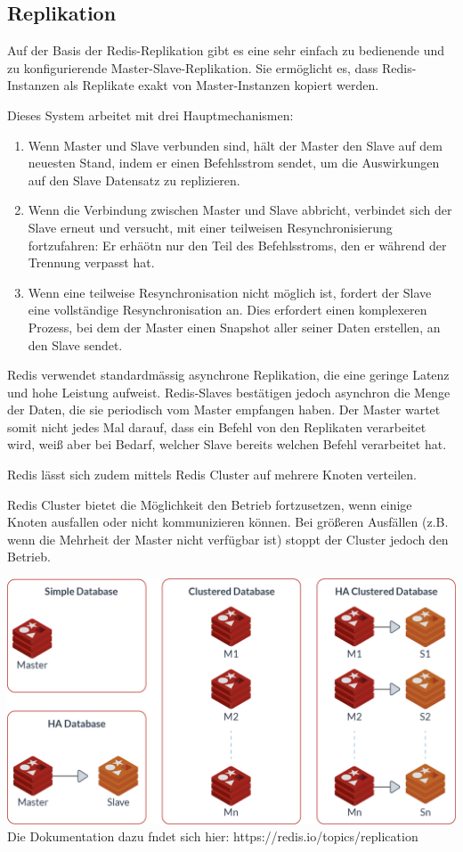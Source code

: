 \subsection{Replikation}
Auf der Basis der Redis-Replikation gibt es eine sehr einfach zu bedienende und zu konfigurierende Master-Slave-Replikation. Sie ermöglicht es, dass Redis-Instanzen als Replikate exakt von Master-Instanzen kopiert werden.

Dieses System arbeitet mit drei Hauptmechanismen:
\begin{enumerate}
\item Wenn Master und Slave verbunden sind, hält der Master den Slave auf dem neuesten Stand, indem er einen Befehlsstrom sendet, um die Auswirkungen auf den Slave Datensatz zu replizieren.
\item Wenn die Verbindung zwischen Master und Slave abbricht, verbindet sich der Slave erneut und versucht, mit einer teilweisen Resynchronisierung fortzufahren: Er erhäötn nur den Teil des Befehlsstroms, den er während der Trennung verpasst hat.
\item Wenn eine teilweise Resynchronisation nicht möglich ist, fordert der Slave eine vollständige Resynchronisation an. Dies erfordert einen komplexeren Prozess, bei dem der Master einen Snapshot aller seiner Daten erstellen, an den Slave sendet.
\end{enumerate}
Redis verwendet standardmässig asynchrone Replikation, die eine geringe Latenz und hohe Leistung aufweist. Redis-Slaves bestätigen jedoch asynchron die Menge der Daten, die sie periodisch vom Master empfangen haben. Der Master wartet somit nicht jedes Mal darauf, dass ein Befehl von den Replikaten verarbeitet wird, weiß aber bei Bedarf, welcher Slave bereits welchen Befehl verarbeitet hat.

Redis lässt sich zudem mittels Redis Cluster auf mehrere Knoten verteilen.

Redis Cluster bietet die Möglichkeit den Betrieb fortzusetzen, wenn einige Knoten ausfallen oder nicht kommunizieren können. Bei größeren Ausfällen (z.B. wenn die Mehrheit der Master nicht verfügbar ist) stoppt der Cluster jedoch den Betrieb.


\includegraphics[width=140mm]{media/diagram-cluster-architecture.png}\\[5mm]	
Die Dokumentation dazu fndet sich hier: https://redis.io/topics/replication
